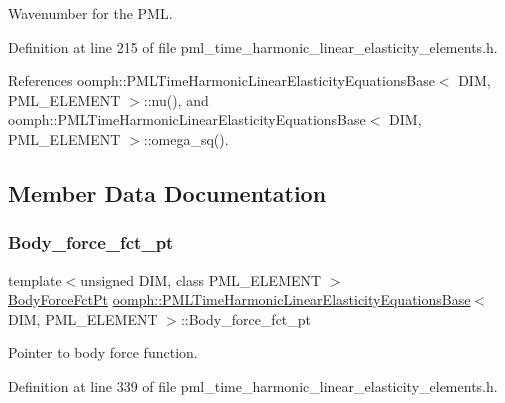 Wavenumber for the P\+ML. 



Definition at line 215 of file pml\+\_\+time\+\_\+harmonic\+\_\+linear\+\_\+elasticity\+\_\+elements.\+h.



References oomph\+::\+P\+M\+L\+Time\+Harmonic\+Linear\+Elasticity\+Equations\+Base$<$ D\+I\+M, P\+M\+L\+\_\+\+E\+L\+E\+M\+E\+N\+T $>$\+::nu(), and oomph\+::\+P\+M\+L\+Time\+Harmonic\+Linear\+Elasticity\+Equations\+Base$<$ D\+I\+M, P\+M\+L\+\_\+\+E\+L\+E\+M\+E\+N\+T $>$\+::omega\+\_\+sq().



\subsection{Member Data Documentation}
\mbox{\label{classoomph_1_1PMLTimeHarmonicLinearElasticityEquationsBase_acc8c7a9df7d314601a8b9c6289f0993b}} 
\subsubsection{\texorpdfstring{Body\+\_\+force\+\_\+fct\+\_\+pt}{Body\_force\_fct\_pt}}
{\footnotesize\ttfamily template$<$unsigned D\+IM, class P\+M\+L\+\_\+\+E\+L\+E\+M\+E\+NT $>$ \\
\hyperlink{classoomph_1_1PMLTimeHarmonicLinearElasticityEquationsBase_a04218d2a825726c0cd6b975d1ecd2f12}{Body\+Force\+Fct\+Pt} \hyperlink{classoomph_1_1PMLTimeHarmonicLinearElasticityEquationsBase}{oomph\+::\+P\+M\+L\+Time\+Harmonic\+Linear\+Elasticity\+Equations\+Base}$<$ D\+IM, P\+M\+L\+\_\+\+E\+L\+E\+M\+E\+NT $>$\+::Body\+\_\+force\+\_\+fct\+\_\+pt\hspace{0.3cm}{\ttfamily [protected]}}



Pointer to body force function. 



Definition at line 339 of file pml\+\_\+time\+\_\+harmonic\+\_\+linear\+\_\+elasticity\+\_\+elements.\+h.



